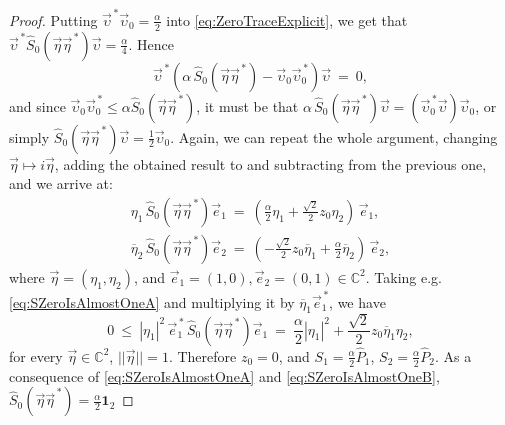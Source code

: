\documentclass[12pt]{article}
\theoremstyle{plain}
\theoremstyle{definition}
\theoremstyle{remark}
\numberwithin{equation}{section}
\begin{document}
\begin{proof}
Putting $\vec{\upsilon}^{\,*} \vec{\upsilon}_{0} = \frac{\alpha}{2}$
into \eqref{eq:ZeroTraceExplicit}, we get that
$
\vec{\upsilon}^{\,*} \hat{S}_{0}(\vec{\eta} \vec{\eta}^{\,*}) \vec{\upsilon} = 
\frac{\alpha}{4}
$.
Hence 
\begin{equation}
 \vec{\upsilon}^{\,*} \left(
    \alpha \, \hat{S}_{0}(\vec{\eta} \vec{\eta}^{\,*}) -\vec{\upsilon}_{0} \vec{\upsilon}_{0}^{\,*}
  \right) \vec{\upsilon} \: = \: 0,
\end{equation}
and since 
$\vec{\upsilon}_{0} \vec{\upsilon}_{0}^{\,*} \leq  \alpha \hat{S}_{0}(\vec{\eta} \vec{\eta}^{\,*})$,
it must be that
$ \alpha \, \hat{S}_{0}(\vec{\eta} \vec{\eta}^{\,*}) \vec{\upsilon} =
\left( \vec{\upsilon}_{0}^{\,*} \vec{\upsilon} \right)  \vec{\upsilon}_{0}$,
or simply
$ \hat{S}_{0}(\vec{\eta} \vec{\eta}^{\,*}) \vec{\upsilon} = \frac{1}{2} \vec{\upsilon}_{0}$.
Again, 
we can repeat the whole argument,
changing $\vec{\eta} \mapsto i \vec{\eta}$,
adding the obtained result to and subtracting from the previous one, 
and we arrive at:
\begin{subequations}
    \begin{align}
\label{eq:SZeroIsAlmostOneA}
\eta_{1} \, \hat{S}_{0}(\vec{\eta} \vec{\eta}^{\,*}) \vec{e}_{1} \: = \: 
   \left( \frac{\alpha}{2} \eta_{1} + \frac{\sqrt{2}}{2} z_{0} \eta_{2} \right) \, \vec{e}_{1}, \\
\label{eq:SZeroIsAlmostOneB}
\overline{\eta}_{2} \, \hat{S}_{0}(\vec{\eta} \vec{\eta}^{\,*}) \vec{e}_{2} \: = \: 
   \left(- \frac{\sqrt{2}}{2} z_{0} \overline{\eta}_{1} + \frac{\alpha}{2} \overline{\eta}_{2} \right) 
       \, \vec{e}_{2},
    \end{align}
\end{subequations}
where $\vec{\eta} = (\eta_{1}, \eta_{2})$, and 
$\vec{e}_{1} = (1,0), \vec{e}_{2} = (0,1) \in \mathbb{C}^{2}$.
Taking e.g. \eqref{eq:SZeroIsAlmostOneA}
and multiplying it by $\overline{\eta}_{1} \vec{e}_{1}^{\,*}$,
we have
\begin{equation}
0 \: \leq \:
 |\eta_{1}|^{2} \, \vec{e}_{1}^{\,*} \, \hat{S}_{0}(\vec{\eta} \vec{\eta}^{\,*}) \vec{e}_{1} 
 \: = \: 
\frac{\alpha}{2} |\eta_{1}|^{2} + \frac{\sqrt{2}}{2} z_{0} \overline{\eta}_{1} \eta_{2},
\end{equation}
for every $\vec{\eta} \in \mathbb{C}^{2}$, $||\vec{\eta}|| =1$. 
Therefore $z_{0} = 0$, and 
$S_{1} = \frac{\alpha}{2} \hat{P}_{1}$,
$S_{2} = \frac{\alpha}{2} \hat{P}_{2}$.
As a consequence of 
\eqref{eq:SZeroIsAlmostOneA} and \eqref{eq:SZeroIsAlmostOneB},
$\hat{S}_{0} (\vec{\eta} \vec{\eta}^{\,*}) = \frac{\alpha}{2} \mathbf{1}_{2}$

\end{proof}
\end{document}
